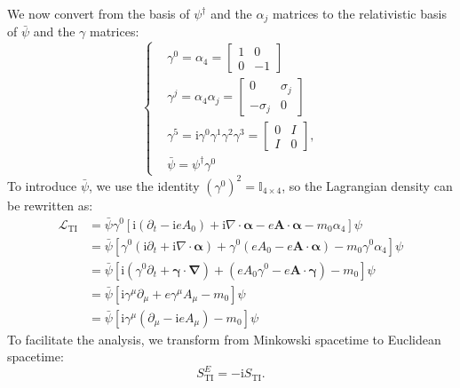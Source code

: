 We now convert from the basis of $\psi^\dagger$ and the $\alpha_j$ matrices to the relativistic basis of $\bar{\psi}$ and the $\gamma$ matrices:
\begin{equation}
\left\{
\begin{aligned}
&\gamma^0 = \alpha_4 = \begin{bmatrix} 1 & 0 \\ 0 & -1 \end{bmatrix} \\
&\gamma^j = \alpha_4 \alpha_j = \begin{bmatrix} 0 & \sigma_j \\ -\sigma_j & 0 \end{bmatrix} \\
&\gamma^5 = \mathrm{i} \gamma^0 \gamma^1 \gamma^2 \gamma^3 = \begin{bmatrix} 0 & I \\ I & 0 \end{bmatrix}, \\
&\bar{\psi} = \psi^\dagger \gamma^0
\end{aligned}
\right.
\end{equation}
To introduce $\bar{\psi}$, we use the identity $(\gamma^0)^2 = \mathbb{I}_{4 \times 4}$, so the Lagrangian density can be rewritten as:
\begin{equation}
\begin{aligned}
\mathcal{L}_{\mathrm{TI}} &= \bar{\psi} \gamma^0 [ \mathrm{i}(\partial_t - \mathrm{i}eA_0) + \mathrm{i} \nabla \cdot \bm{\alpha} - e \bm{A} \cdot \bm{\alpha} - m_0 \alpha_4 ] \psi \\
&= \bar{\psi} [ \gamma^0 (\mathrm{i}\partial_t + \mathrm{i}\nabla \cdot \bm{\alpha}) + \gamma^0 (eA_0 - e\bm{A} \cdot \bm{\alpha}) - m_0 \gamma^0 \alpha_4 ] \psi \\
&= \bar{\psi} [ \mathrm{i} (\gamma^0 \partial_t + \bm{\gamma} \cdot \bm{\nabla}) + (eA_0 \gamma^0 - e\bm{A} \cdot \bm{\gamma}) - m_0 ] \psi \\
&= \bar{\psi} [ \mathrm{i} \gamma^\mu \partial_\mu + e \gamma^\mu A_\mu - m_0 ] \psi \\
&= \bar{\psi} [ \mathrm{i} \gamma^\mu (\partial_\mu - \mathrm{i}eA_\mu) - m_0 ] \psi
\end{aligned}
\end{equation}
To facilitate the analysis, we transform from Minkowski spacetime to Euclidean spacetime:
\begin{equation}
S_{\mathrm{TI}}^E = -\mathrm{i} S_{\mathrm{TI}}.
\end{equation}

